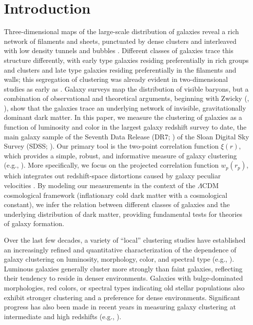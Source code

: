 \documentclass[]{emulateapj}
\newcommand{\wrp}{{w_p(r_p)}}
\begin{document}


\section{Introduction}
\label{sec:intro}

Three-dimensional maps of the large-scale distribution of galaxies
reveal a rich network of filaments and sheets, punctuated by dense
clusters and interleaved with low density tunnels and bubbles
\citep{gregory78,kirshner81,davis82,giovanelli86,geller89,shectman96,colless01}.
Different classes of galaxies trace this structure differently,
with early type galaxies residing preferentially in rich groups and 
clusters and late type galaxies residing preferentially
in the filaments and
walls; this segregation of clustering was already evident in 
two-dimensional studies as early as \cite{hubble36}.
Galaxy surveys map the distribution of visible baryons, but a combination
of observational and theoretical arguments, beginning with
Zwicky (\citeyear{zwicky33}, \citeyear{zwicky37}),
show that the galaxies trace an underlying network of invisible,
gravitationally dominant dark matter. In this paper, we measure the 
clustering of galaxies as a function of luminosity and color in the
largest galaxy redshift survey to date, the main galaxy sample
\citep{strauss02} of the Seventh Data Release (DR7; \citealt{abazajian09}) 
of the Sloan Digital Sky Survey (SDSS; \citealt{york00}).
Our primary tool is the two-point correlation function $\xi(r)$, which
provides a simple, robust, and informative measure
of galaxy clustering (e.g., \citealt{peebles80}). More specifically,
we focus on the projected correlation function $\wrp$, which  integrates out 
redshift-space distortions caused by galaxy peculiar velocities
\citep{davis83}. By modeling our measurements in the
context of the $\Lambda$CDM cosmological framework (inflationary cold dark
matter with a cosmological constant), we infer the relation
between different classes of galaxies and the underlying distribution
of dark matter, providing fundamental tests for theories of galaxy formation.


Over the last few decades, a variety of ``local'' clustering studies
have established an increasingly refined and quantitative characterization
of the dependence of galaxy clustering on luminosity, morphology, color, 
and spectral type (e.g.,
\citealt{davis76,davis88,hamilton88,alimi88,valls89,loveday95,benoist96,guzzo97,willmer98,brown00,norberg01,norberg02,zehavi02,budavari03,madgwick03,zehavi05b,li06,swanson08,loh09}).
Luminous galaxies generally cluster more strongly than faint galaxies,
reflecting their tendency to reside in denser environments.
Galaxies with bulge-dominated morphologies, red colors, or spectral
types indicating old stellar populations also exhibit
stronger clustering and a preference for dense environments.
%
Significant progress has also been made in recent years in measuring
galaxy clustering at intermediate and high redshifts 
(e.g., \citealt{brown03,daddi03,adelberger05b,ouchi05,lee05,phleps05,coil06,coil07,meneux07,meneux09,abbas10}).
\end{document}
